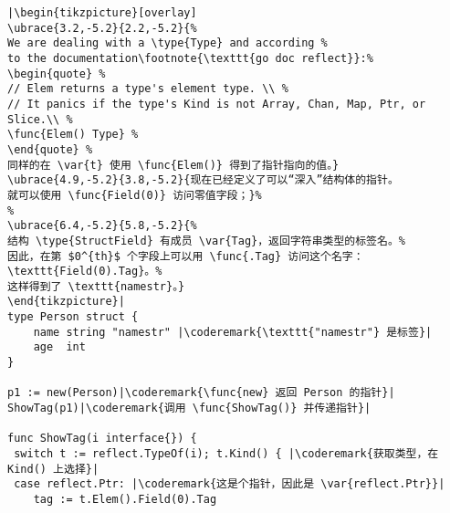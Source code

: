 \begin{lstlisting}[caption=使用反射自省,label=src:introspection]
|\begin{tikzpicture}[overlay]
\ubrace{3.2,-5.2}{2.2,-5.2}{%
We are dealing with a \type{Type} and according %
to the documentation\footnote{\texttt{go doc reflect}}:%
\begin{quote} %
// Elem returns a type's element type. \\ %
// It panics if the type's Kind is not Array, Chan, Map, Ptr, or Slice.\\ %
\func{Elem() Type} %
\end{quote} %
同样的在 \var{t} 使用 \func{Elem()} 得到了指针指向的值。}
\ubrace{4.9,-5.2}{3.8,-5.2}{现在已经定义了可以“深入”结构体的指针。
就可以使用 \func{Field(0)} 访问零值字段；}%
%
\ubrace{6.4,-5.2}{5.8,-5.2}{%
结构 \type{StructField} 有成员 \var{Tag}，返回字符串类型的标签名。%
因此，在第 $0^{th}$ 个字段上可以用 \func{.Tag} 访问这个名字：\texttt{Field(0).Tag}。%
这样得到了 \texttt{namestr}。}
\end{tikzpicture}|
type Person struct {
    name string "namestr" |\coderemark{\texttt{"namestr"} 是标签}|
    age  int
}

p1 := new(Person)|\coderemark{\func{new} 返回 Person 的指针}|
ShowTag(p1)|\coderemark{调用 \func{ShowTag()} 并传递指针}|

func ShowTag(i interface{}) {
 switch t := reflect.TypeOf(i); t.Kind() { |\coderemark{获取类型，在 Kind() 上选择}|
 case reflect.Ptr: |\coderemark{这是个指针，因此是 \var{reflect.Ptr}}|
	tag := t.Elem().Field(0).Tag
\end{lstlisting}
